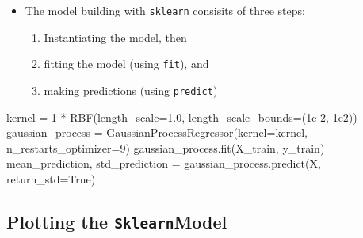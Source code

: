 \documentclass[
  letterpaper,
  DIV=11,
  numbers=noendperiod]{scrreprt}
\newenvironment{Shaded}{\begin{snugshade}}{\end{snugshade}}
\newcommand{\DecValTok}[1]{\textcolor[rgb]{0.68,0.00,0.00}{#1}}
\newcommand{\FloatTok}[1]{\textcolor[rgb]{0.68,0.00,0.00}{#1}}
\newcommand{\NormalTok}[1]{\textcolor[rgb]{0.00,0.23,0.31}{#1}}
\newcommand{\OperatorTok}[1]{\textcolor[rgb]{0.37,0.37,0.37}{#1}}
\newcommand{\VariableTok}[1]{\textcolor[rgb]{0.07,0.07,0.07}{#1}}
\providecommand{\tightlist}{%
  \setlength{\itemsep}{0pt}\setlength{\parskip}{0pt}}\usepackage{longtable,booktabs,array}
\begin{document}
\begin{itemize}
\tightlist
\item
  The model building with \texttt{sklearn} consisits of three steps:

  \begin{enumerate}
  \def\labelenumi{\arabic{enumi}.}
  \tightlist
  \item
    Instantiating the model, then
  \item
    fitting the model (using \texttt{fit}), and
  \item
    making predictions (using \texttt{predict})
  \end{enumerate}
\end{itemize}

\begin{Shaded}
\begin{Highlighting}[]
\NormalTok{kernel }\OperatorTok{=} \DecValTok{1} \OperatorTok{*}\NormalTok{ RBF(length\_scale}\OperatorTok{=}\FloatTok{1.0}\NormalTok{, length\_scale\_bounds}\OperatorTok{=}\NormalTok{(}\FloatTok{1e{-}2}\NormalTok{, }\FloatTok{1e2}\NormalTok{))}
\NormalTok{gaussian\_process }\OperatorTok{=}\NormalTok{ GaussianProcessRegressor(kernel}\OperatorTok{=}\NormalTok{kernel, n\_restarts\_optimizer}\OperatorTok{=}\DecValTok{9}\NormalTok{)}
\NormalTok{gaussian\_process.fit(X\_train, y\_train)}
\NormalTok{mean\_prediction, std\_prediction }\OperatorTok{=}\NormalTok{ gaussian\_process.predict(X, return\_std}\OperatorTok{=}\VariableTok{True}\NormalTok{)}
\end{Highlighting}
\end{Shaded}

\subsection{\texorpdfstring{Plotting the
\texttt{Sklearn}Model}{Plotting the SklearnModel}}\label{plotting-the-sklearnmodel}
\end{document}
